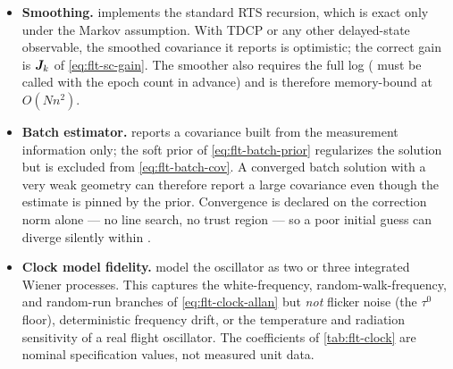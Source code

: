 \begin{itemize}[leftmargin=1.4em]
  \item \textbf{Smoothing.}  implements the standard
    RTS recursion, which is exact only under the Markov assumption. With TDCP
    or any other delayed-state observable, the smoothed covariance it reports
    is optimistic; the correct gain is $\bm{J}_k$ of
    \cref{eq:flt-sc-gain}. The smoother also requires the full log
    ( must be called with the epoch count in advance) and
    is therefore memory-bound at $O(N n^2)$.

  \item \textbf{Batch estimator.}  reports a covariance
    built from the measurement information only; the soft prior of
    \cref{eq:flt-batch-prior} regularizes the solution but is excluded from
    \cref{eq:flt-batch-cov}. A converged batch solution with a very weak
    geometry can therefore report a large covariance even though the estimate
    is pinned by the prior. Convergence is declared on the correction norm
    alone --- no line search, no trust region --- so a poor initial guess can
    diverge silently within .

  \item \textbf{Clock model fidelity.} 
    model the oscillator as two or three integrated Wiener processes. This
    captures the white-frequency, random-walk-frequency, and random-run
    branches of \cref{eq:flt-clock-allan} but \emph{not} flicker noise (the
    $\tau^0$ floor), deterministic frequency drift, or the temperature and
    radiation sensitivity of a real flight oscillator. The coefficients of
    \cref{tab:flt-clock} are nominal specification values, not measured unit
    data.
\end{itemize}
